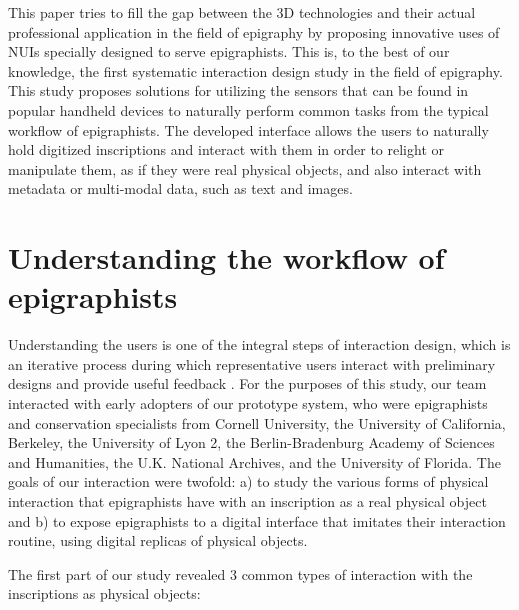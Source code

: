 \documentclass[amsthm,ebook]{saparticle}
\begin{document}
This paper tries to fill the gap between the 3D technologies and their actual professional application in the field of
epigraphy by proposing innovative uses of NUIs specially designed to serve epigraphists. This is, to the best of our
knowledge, the first systematic interaction design study in the field of epigraphy. This study proposes solutions for
utilizing the sensors that can be found in popular handheld devices to naturally perform common tasks from the typical
workflow of epigraphists. The developed interface allows the users to naturally hold digitized inscriptions and
interact with them in order to relight or manipulate them, as if they were real physical objects, and also interact
with metadata or multi-modal data, such as text and images. 

\section{Understanding the workflow of epigraphists}


\noindent Understanding the users is one of the integral steps of interaction design, which is an iterative process during which
representative users interact with preliminary designs and provide useful feedback \citep{preece_interaction_2015}. For the
purposes of this study, our team interacted with early adopters of our prototype system, who were epigraphists and
conservation specialists from Cornell University, the University of California, Berkeley, the University of Lyon 2, the
Berlin-Bradenburg Academy of Sciences and Humanities, the U.K. National Archives, and the University of Florida. The
goals of our interaction were twofold: a) to study the various forms of physical interaction that epigraphists have
with an inscription as a real physical object and b) to expose epigraphists to a digital interface that imitates
their interaction routine, using digital replicas of physical objects.

The first part of our study revealed 3 common types of interaction with the inscriptions as physical objects:
\end{document}
